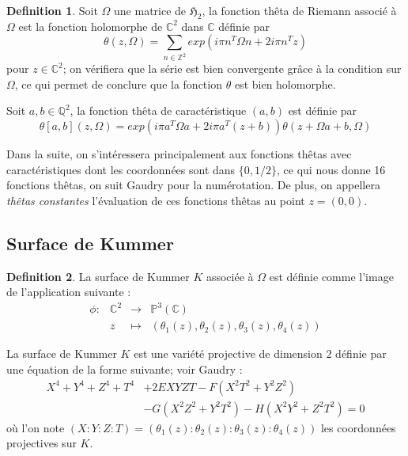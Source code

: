 \documentclass[a4paper]{article}
\theoremstyle{definition}
\newtheorem{definition}{Definition}[section]
\theoremstyle{remark}
\numberwithin{equation}{section}
\begin{document}
\begin{definition}
Soit $\Omega$ une matrice de $\mathfrak{H}_2$, la fonction thêta de Riemann associé à $\Omega$ est la fonction holomorphe de $\mathbb{C}^2$ dans $\mathbb{C}$ définie par
$$\theta(z,\Omega) = \sum_{n \in \mathbb{Z}^2}{exp(i\pi n^T \Omega n + 2i\pi n^T z)}$$
pour $z \in \mathbb{C}^2$; on vérifiera que la série est bien convergente grâce à la condition sur $\Omega$, ce qui permet de conclure que la fonction $\theta$ est bien holomorphe.

Soit $a,b \in \mathbb{Q}^2$, la fonction thêta de caractéristique $(a,b)$ est définie par
$$\theta[a,b](z,\Omega) = exp(i\pi a^T\Omega a + 2i\pi a^T(z+b))\theta(z + \Omega a + b, \Omega)$$
\end{definition}

Dans la suite, on s'intéressera principalement aux fonctions thêtas avec caractéristiques dont les coordonnées sont dans $\{0,1/2\}$, ce qui nous donne 16 fonctions thêtas, on suit Gaudry \cite{gaudry} pour la numérotation. De plus, on appellera \emph{thêtas constantes} l'évaluation de ces fonctions thêtas au point $z=(0,0)$.

\subsection{Surface de Kummer}

\begin{definition}
La surface de Kummer $K$ associée à $\Omega$ est définie comme l'image de l'application suivante :
\begin{equation*}
\begin{array}{lrcl}
\phi :&\mathbb{C}^2 & \longrightarrow & \mathbb{P}^3(\mathbb{C}) \\
& z & \longmapsto & (\theta_1(z),\theta_2(z),\theta_3(z),\theta_4(z))
\end{array}
\end{equation*}
\end{definition}

La surface de Kummer $K$ est une variété projective de dimension $2$ définie par une équation de la forme suivante; voir Gaudry \cite{gaudry} :
\begin{align*}
X^4+Y^4+Z^4+T^4&+2EXYZT-F(X^2T^2+Y^2Z^2) \\
&-G(X^2Z^2+Y^2T^2)-H(X^2Y^2+Z^2T^2)=0
\end{align*}
où l'on note $(X:Y:Z:T)=(\theta_1(z):\theta_2(z):\theta_3(z):\theta_4(z))$ les coordonnées projectives sur $K$.
\end{document}
